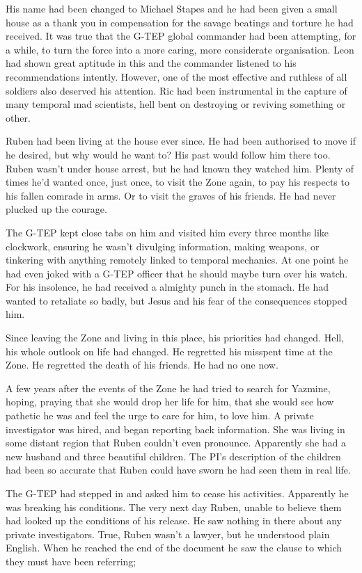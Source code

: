 His name had been changed to Michael Stapes and he had been given a small house as a thank you in compensation for the savage beatings and torture he had received.  It was true that the G-TEP global commander had been attempting, for a while, to turn the force into a more caring, more considerate organisation.  Leon had shown great aptitude in this and the commander listened to his recommendations intently.  However, one of the most effective and ruthless of all soldiers also deserved his attention.  Ric had been instrumental in the capture of many temporal mad scientists, hell bent on destroying or reviving something or other.

Ruben had been living at the house ever since.  He had been authorised to move if he desired, but why would he want to?  His past would follow him there too.  Ruben wasn't under house arrest, but he had known they watched him.  Plenty of times he'd wanted once, just once, to visit the Zone again, to pay his respects to his fallen comrade in arms.  Or to visit the graves of his friends.  He had never plucked up the courage.  

The G-TEP kept close tabs on him and visited him every three months like clockwork, ensuring he wasn't divulging information, making weapons, or tinkering with anything remotely linked to temporal mechanics.  At one point he had even joked with a G-TEP officer that he should maybe turn over his watch.  For his insolence, he had received a almighty punch in the stomach.  He had wanted to retaliate so badly, but Jesus and his fear of the consequences stopped him.

Since leaving the Zone and living in this place, his priorities had changed.  Hell, his whole outlook on life had changed.  He regretted his misspent time at the Zone.  He regretted the death of his friends.  He had no one now.  

A few years after the events of the Zone he had tried to search for Yazmine, hoping, praying that she would drop her life for him, that she would see how pathetic he was and feel the urge to care for him, to love him.  A private investigator was hired, and began reporting back information.  She was living in some distant region that Ruben couldn't even pronounce.  Apparently she had a new husband and three beautiful children.  The PI's description of the children had been so accurate that Ruben could have sworn he had seen them in real life.

The G-TEP had stepped in and asked him to cease his activities.  Apparently he was breaking his conditions.  The very next day Ruben, unable to believe them had looked up the conditions of his release.  He saw nothing in there about any private investigators.  True, Ruben wasn't a lawyer, but he understood plain English.  When he reached the end of the document he saw the clause to which they must have been referring;




